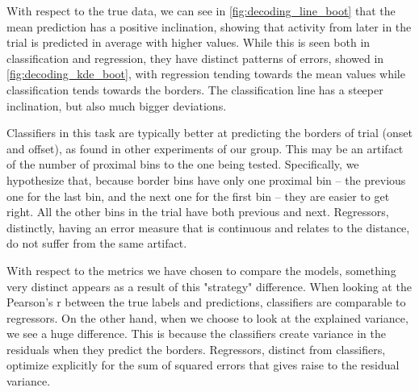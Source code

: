 With respect to the true data, we can see in \ref{fig:decoding_line_boot} that the mean prediction has a positive inclination, showing that activity from later in the trial is predicted in average with higher values. While this is seen both in classification and regression, they have distinct patterns of errors, showed in \ref{fig:decoding_kde_boot}, with regression tending towards the mean values while classification tends towards the borders. The classification line has a steeper inclination, but also much bigger deviations. 

Classifiers in this task are typically better at predicting the borders of trial (onset and offset), as found in other experiments of our group. This may be an artifact of the number of proximal bins to the one being tested. Specifically, we hypothesize that, because border bins have only one proximal bin -- the previous one for the last bin, and the next one for the first bin -- they are easier to get right. All the other bins in the trial have both previous and next. Regressors, distinctly, having an error measure that is continuous and relates to the distance, do not suffer from the same artifact.

With respect to the metrics we have chosen to compare the models, something very distinct appears as a result of this "strategy" difference. When looking at the Pearson's r between the true labels and predictions, classifiers are comparable to regressors. On the other hand, when we choose to look at the explained variance, we see a huge difference. This is because the classifiers create variance in the residuals when they predict the borders. Regressors, distinct from classifiers, optimize explicitly for the sum of squared errors that gives raise to the residual variance.
